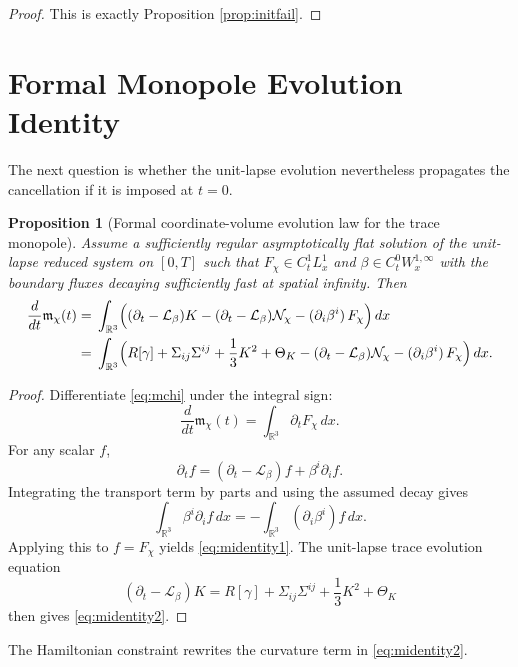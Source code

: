 \documentclass[11pt]{article}
\newcommand{\Ell}{\mathcal{L}}
\newtheorem{proposition}{Proposition}
\begin{document}
\begin{proof}
This is exactly Proposition \ref{prop:initfail}.
\end{proof}

\section{Formal Monopole Evolution Identity}

The next question is whether the unit-lapse evolution nevertheless propagates the cancellation if it is imposed at \(t=0\).

\begin{proposition}[Formal coordinate-volume evolution law for the trace monopole]
\label{prop:midentity}
Assume a sufficiently regular asymptotically flat solution of the unit-lapse reduced system on \([0,T]\) such that \(F_\chi\in C^1_tL^1_x\) and \(\beta\in C_t^0W^{1,\infty}_x\) with the boundary fluxes decaying sufficiently fast at spatial infinity. Then
\begin{align}
\frac{d}{dt}\mathfrak m_\chi(t)
=\;&
\int_{\mathbb R^3}
\Bigl(
(\partial_t-\Ell_\beta)K
- (\partial_t-\Ell_\beta)\mathcal N_\chi
- (\partial_i\beta^i)\,F_\chi
\Bigr)\,dx
\label{eq:midentity1}
\\
=\;&
\int_{\mathbb R^3}
\Bigl(
R[\gamma]
+ \Sigma_{ij}\Sigma^{ij}
+ \frac{1}{3}K^2
+ \Theta_K
- (\partial_t-\Ell_\beta)\mathcal N_\chi
- (\partial_i\beta^i)\,F_\chi
\Bigr)\,dx.
\label{eq:midentity2}
\end{align}
\end{proposition}

\begin{proof}
Differentiate \eqref{eq:mchi} under the integral sign:
\[
\frac{d}{dt}\mathfrak m_\chi(t)
=
\int_{\mathbb R^3}\partial_tF_\chi\,dx.
\]
For any scalar \(f\),
\[
\partial_t f
=
(\partial_t-\Ell_\beta)f + \beta^i\partial_i f.
\]
Integrating the transport term by parts and using the assumed decay gives
\[
\int_{\mathbb R^3}\beta^i\partial_i f\,dx
=
-\int_{\mathbb R^3}(\partial_i\beta^i)f\,dx.
\]
Applying this to \(f=F_\chi\) yields \eqref{eq:midentity1}. The unit-lapse trace evolution equation
\begin{equation}
(\partial_t-\Ell_\beta)K
=
R[\gamma]
+ \Sigma_{ij}\Sigma^{ij}
+ \frac{1}{3}K^2
+ \Theta_K
\label{eq:Kdt}
\end{equation}
then gives \eqref{eq:midentity2}.
\end{proof}

The Hamiltonian constraint rewrites the curvature term in \eqref{eq:midentity2}.
\end{document}

